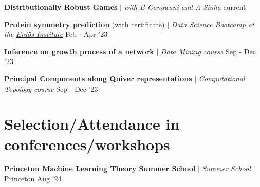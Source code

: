 \resumeProjectHeading
{\textbf{Distributionally Robust Games} $|$ \textit{\color{gray}with B Gangwani and A Sinha}}
{current}
{}
\vspace{\mygap}

\resumeProjectHeading
{\href{https://www.erdosinstitute.org/certificates/spring-2024/data-science-boot-camp/nilava-metya}{\textbf{Protein symmetry prediction} (with certificate)} $|$ \textit{\color{gray}Data Science Bootcamp at the \href{https://www.erdosinstitute.org}{Erd\"os Institute}}}
{Feb - Apr '23}
{}
\vspace{\mygap}


\resumeProjectHeading
{\href{https://youtu.be/l2dJ6WUBLzs}
{\textbf{Inference on growth process of a network}} $|$ \textit{\color{gray}Data Mining course}}
{Sep - Dec '23}
{}
\vspace{\mygap}

\resumeProjectHeading
{\href{https://nilavam.github.io/TDA_quiver.pdf}{\textbf{Principal Components along Quiver representations}} $|$ \textit{\color{gray}Computational Topology course}}
{Sep - Dec '23}
{}
\vspace{\gap}



\resumeSubHeadingListEnd

\section{Selection/Attendance in conferences/workshops}
\resumeSubHeadingListStart


\resumeProjectHeading
{\textbf{Princeton Machine Learning Theory Summer School} $|$ \textit{\color{gray}Summer School} $|$ Princeton}
{Aug '24}
{}
\vspace{\mygap}


